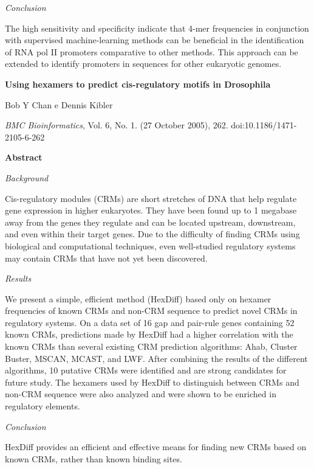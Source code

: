 {\it Conclusion}

The high sensitivity and specificity indicate that 4-mer frequencies in conjunction with supervised machine-learning methods can be beneficial in the identification of RNA pol II promoters comparative to other methods. This approach can be extended to identify promoters in sequences for other eukaryotic genomes.



{\Large \bf Using hexamers to predict cis-regulatory motifs in Drosophila}

Bob Y Chan e Dennis Kibler

{\it BMC Bioinformatics}, Vol. 6, No. 1. (27 October 2005), 262. doi:10.1186/1471-2105-6-262

{\large \bf Abstract}

{\it Background}

Cis-regulatory modules (CRMs) are short stretches of DNA that help regulate gene expression in higher eukaryotes. They have been found up to 1 megabase away from the genes they regulate and can be located upstream, downstream, and even within their target genes. Due to the difficulty of finding CRMs using biological and computational techniques, even well-studied regulatory systems may contain CRMs that have not yet been discovered.

{\it Results}

We present a simple, efficient method (HexDiff) based only on hexamer frequencies of known CRMs and non-CRM sequence to predict novel CRMs in regulatory systems. On a data set of 16 gap and pair-rule genes containing 52 known CRMs, predictions made by HexDiff had a higher correlation with the known CRMs than several existing CRM prediction algorithms: Ahab, Cluster Buster, MSCAN, MCAST, and LWF. After combining the results of the different algorithms, 10 putative CRMs were identified and are strong candidates for future study. The hexamers used by HexDiff to distinguish between CRMs and non-CRM sequence were also analyzed and were shown to be enriched in regulatory elements.

{\it Conclusion}

HexDiff provides an efficient and effective means for finding new CRMs based on known CRMs, rather than known binding sites.